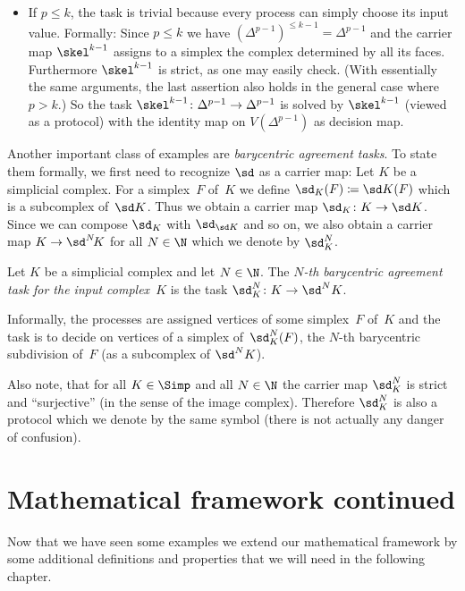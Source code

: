 \begin{thExample}
\begin{itemize}
        \item
            If $p\leq k$, the task is trivial because every process can simply
            choose its input value. Formally: Since $p\leq k$ we have
            $(\Delta^{p-1})^{\leq k-1} = \Delta^{p-1}$ and the carrier map
            $\skel^{k-1}$ assigns to a simplex the complex determined by all its
            faces. Furthermore $\skel^{k-1}$ is strict, as one may easily check.
            (With essentially the same arguments, the last assertion also holds
            in the general case where $p > k$.) So the task
            $\skel^{k-1}\colon\Delta^{p-1}\to\Delta^{p-1}$ is solved by
            $\skel^{k-1}$ (viewed as a protocol) with the identity map
            on $V(\Delta^{p-1})$ as decision map.
    \end{itemize}
\end{thExample}

Another important class of examples are \emph{barycentric agreement tasks}. To
state them formally, we first need to recognize $\sd$ as a carrier map:
Let $K$ be a simplicial complex. For a simplex~$F$ of~$K$ we define
$\sd_K(F) \defeq \sd K(F)$ which is a subcomplex of~$\sd K$. Thus we
obtain a carrier map $\sd_K\colon K\to\sd K$. Since we can compose
$\sd_K$ with $\sd_{\sd K}$ and so on, we also obtain a carrier map
$K\to\sd^N\!K$ for all $N\in\N$ which we denote by $\sd_K^N$.

\begin{thExample}
    \label{ch2:barycentricagreement}
    Let $K$ be a simplicial complex and let $N\in\N$. The
    \emph{$N$-th barycentric agreement task for the input complex~$K$}
    is the task $\sd_K^N\colon K\to\sd^N K$.
    
    Informally, the processes are assigned vertices of some simplex~$F$
    of~$K$ and the task is to decide on vertices of a simplex
    of~$\sd_K^N(F)$, the $N$-th barycentric subdivision of~$F$
    (as a subcomplex of $\sd^N K$).
\end{thExample}

Also note, that for all $K\in\Simp$ and all $N\in\N$ the carrier map
$\sd_K^N$ is strict and \enquote{surjective} (in the sense of the image
complex). Therefore $\sd_K^N$ is also a protocol which we denote by
the same symbol (there is not actually any danger of confusion).


\section{Mathematical framework continued}
Now that we have seen some examples we extend our mathematical
framework by some additional definitions and properties that we
will need in the following chapter.

